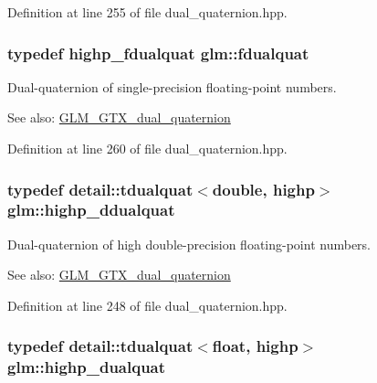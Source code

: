 Definition at line 255 of file dual\_\-quaternion.hpp.\hypertarget{group__gtc__dual__quaternion_g436906129bc69ca5059555cafcbac9fd}{
\subsubsection[fdualquat]{\setlength{\rightskip}{0pt plus 5cm}typedef highp\_\-fdualquat {\bf glm::fdualquat}}}
\label{group__gtc__dual__quaternion_g436906129bc69ca5059555cafcbac9fd}


Dual-quaternion of single-precision floating-point numbers.

\begin{Desc}
\item[See also:]\hyperlink{group__gtc__dual__quaternion}{GLM\_\-GTX\_\-dual\_\-quaternion} \end{Desc}


Definition at line 260 of file dual\_\-quaternion.hpp.\hypertarget{group__gtc__dual__quaternion_g61b654c21f080135aedcf23461eb1037}{
\subsubsection[highp\_\-ddualquat]{\setlength{\rightskip}{0pt plus 5cm}typedef detail::tdualquat$<$double, highp$>$ {\bf glm::highp\_\-ddualquat}}}
\label{group__gtc__dual__quaternion_g61b654c21f080135aedcf23461eb1037}


Dual-quaternion of high double-precision floating-point numbers.

\begin{Desc}
\item[See also:]\hyperlink{group__gtc__dual__quaternion}{GLM\_\-GTX\_\-dual\_\-quaternion} \end{Desc}


Definition at line 248 of file dual\_\-quaternion.hpp.\hypertarget{group__gtc__dual__quaternion_gf3a01deb502f53ca555ee1d45e6d6776}{
\subsubsection[highp\_\-dualquat]{\setlength{\rightskip}{0pt plus 5cm}typedef detail::tdualquat$<$float, highp$>$ {\bf glm::highp\_\-dualquat}}}
\label{group__gtc__dual__quaternion_gf3a01deb502f53ca555ee1d45e6d6776}


